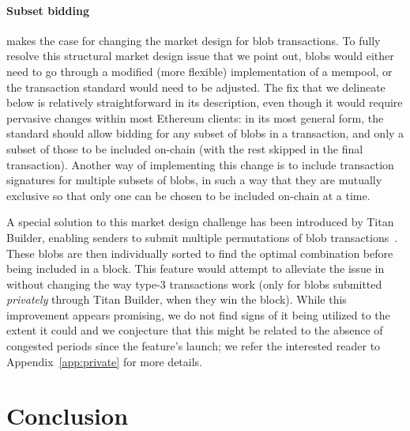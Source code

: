 \paragraph{Subset bidding}  makes the case for changing the market design for blob transactions. To fully resolve this structural market design issue that we point out, blobs would either need to go through a modified (more flexible) implementation of a mempool, or the transaction standard would need to be adjusted.
The fix that we delineate below is relatively straightforward in its description, even though it would require pervasive changes within most Ethereum clients: in its most general form, the standard should allow bidding for any subset of blobs in a transaction, and only a subset of those to be included on-chain (with the rest skipped in the final transaction).
Another way of implementing this change is to include transaction signatures for multiple subsets of blobs, in such a way that they are mutually exclusive so that only one can be chosen to be included on-chain at a time.

A special solution to this market design challenge has been introduced by Titan Builder, enabling senders to submit multiple permutations of blob transactions~\parencite{titanbuilderxyz2024api,titanbuilderxyz2024}. These blobs are then individually sorted to find the optimal combination before being included in a block.
This feature would attempt to alleviate the issue in  without changing the way type-3 transactions work (only for blobs submitted \emph{privately} through Titan Builder, when they win the block). While this improvement appears promising, we do not find signs of it being utilized to the extent it could and we conjecture that this might be related to the absence of congested periods since the feature's launch; we refer the interested reader to Appendix~\ref{app:private} for more details.



















\section{Conclusion}

